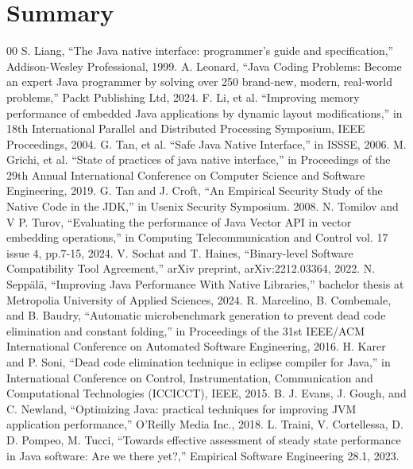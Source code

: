 \documentclass[conference]{IEEEtran}
\begin{document}
\section*{Summary}
    

\begin{thebibliography}{00}
     S. Liang, ``The Java native interface: programmer's guide and specification,'' Addison-Wesley Professional, 1999.
     A. Leonard, ``Java Coding Problems: Become an expert Java programmer by solving over 250 brand-new, modern, real-world problems,'' Packt Publishing Ltd, 2024.
     F. Li, et al. ``Improving memory performance of embedded Java applications by dynamic layout modifications,'' in 18th International Parallel and Distributed Processing Symposium, IEEE Proceedings, 2004.
     G. Tan, et al. ``Safe Java Native Interface,'' in ISSSE, 2006.
     M. Grichi, et al. ``State of practices of java native interface,'' in Proceedings of the 29th Annual International Conference on Computer Science and Software Engineering, 2019.
     G. Tan and J. Croft, ``An Empirical Security Study of the Native Code in the JDK,'' in Usenix Security Symposium. 2008.
     N. Tomilov and V P. Turov, ``Evaluating the performance of Java Vector API in vector embedding operations,'' in Computing Telecommunication and Control vol. 17 issue 4, pp.7-15, 2024.
     V. Sochat and T. Haines, ``Binary-level Software Compatibility Tool Agreement,'' arXiv preprint, arXiv:2212.03364, 2022.
     N. Seppälä, ``Improving Java Performance With Native Libraries,'' bachelor thesis at Metropolia University of Applied Sciences, 2024.
     R. Marcelino, B. Combemale, and B. Baudry, ``Automatic microbenchmark generation to prevent dead code elimination and constant folding,'' in Proceedings of the 31st IEEE/ACM International Conference on Automated Software Engineering, 2016.
     H. Karer and P. Soni, ``Dead code elimination technique in eclipse compiler for Java,'' in International Conference on Control, Instrumentation, Communication and Computational Technologies (ICCICCT), IEEE, 2015.
     B. J. Evans, J. Gough, and C. Newland, ``Optimizing Java: practical techniques for improving JVM application performance,'' O'Reilly Media Inc., 2018.
     L. Traini, V. Cortellessa, D. D. Pompeo, M. Tucci, ``Towards effective assessment of steady state performance in Java software: Are we there yet?,'' Empirical Software Engineering 28.1, 2023.
\end{thebibliography}
\end{document}
